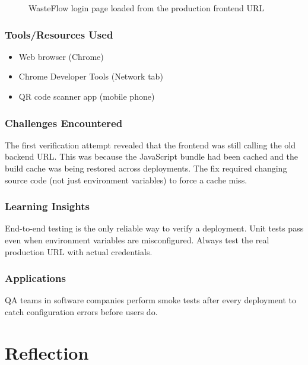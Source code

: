 \documentclass[12pt,a4paper]{article}
\begin{document}
\begin{figure}[H]
    \centering
    \caption{WasteFlow login page loaded from the production frontend URL}
    \label{fig:login_page}
\end{figure}

\subsubsection*{Tools/Resources Used}
\begin{itemize}
    \item Web browser (Chrome)
    \item Chrome Developer Tools (Network tab)
    \item QR code scanner app (mobile phone)
\end{itemize}

\subsubsection*{Challenges Encountered}
The first verification attempt revealed that the frontend was still calling the old backend URL. This was because the JavaScript bundle had been cached and the build cache was being restored across deployments. The fix required changing source code (not just environment variables) to force a cache miss.

\subsubsection*{Learning Insights}
End-to-end testing is the only reliable way to verify a deployment. Unit tests pass even when environment variables are misconfigured. Always test the real production URL with actual credentials.

\subsubsection*{Applications}
QA teams in software companies perform smoke tests after every deployment to catch configuration errors before users do.

\newpage
\section{Reflection}
\label{sec:reflection}
\end{document}
